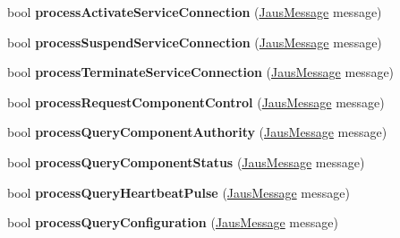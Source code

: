 \begin{DoxyCompactItemize}
\item 
\hypertarget{class_node_manager_component_ab9443469df32a00207f44ea2fa07f531}{bool {\bfseries process\-Activate\-Service\-Connection} (\hyperlink{struct_jaus_message_struct}{\-Jaus\-Message} message)}\label{class_node_manager_component_ab9443469df32a00207f44ea2fa07f531}

\item 
\hypertarget{class_node_manager_component_a3ed305004e96334fae763288e8a551cc}{bool {\bfseries process\-Suspend\-Service\-Connection} (\hyperlink{struct_jaus_message_struct}{\-Jaus\-Message} message)}\label{class_node_manager_component_a3ed305004e96334fae763288e8a551cc}

\item 
\hypertarget{class_node_manager_component_a898b7b6e91779ea6cbbbf28807718c7d}{bool {\bfseries process\-Terminate\-Service\-Connection} (\hyperlink{struct_jaus_message_struct}{\-Jaus\-Message} message)}\label{class_node_manager_component_a898b7b6e91779ea6cbbbf28807718c7d}

\item 
\hypertarget{class_node_manager_component_a0e5a0329938c340ba983cdf57c12250f}{bool {\bfseries process\-Request\-Component\-Control} (\hyperlink{struct_jaus_message_struct}{\-Jaus\-Message} message)}\label{class_node_manager_component_a0e5a0329938c340ba983cdf57c12250f}

\item 
\hypertarget{class_node_manager_component_a177102f3bf05f35df44d4f084e5f17dc}{bool {\bfseries process\-Query\-Component\-Authority} (\hyperlink{struct_jaus_message_struct}{\-Jaus\-Message} message)}\label{class_node_manager_component_a177102f3bf05f35df44d4f084e5f17dc}

\item 
\hypertarget{class_node_manager_component_abda643955bbb5515d785b2b74fcdbbdc}{bool {\bfseries process\-Query\-Component\-Status} (\hyperlink{struct_jaus_message_struct}{\-Jaus\-Message} message)}\label{class_node_manager_component_abda643955bbb5515d785b2b74fcdbbdc}

\item 
\hypertarget{class_node_manager_component_a9ae4993d1f083f60d656c70029b86e24}{bool {\bfseries process\-Query\-Heartbeat\-Pulse} (\hyperlink{struct_jaus_message_struct}{\-Jaus\-Message} message)}\label{class_node_manager_component_a9ae4993d1f083f60d656c70029b86e24}

\item 
\hypertarget{class_node_manager_component_a2e81021c39bdab04c104fe00d34db645}{bool {\bfseries process\-Query\-Configuration} (\hyperlink{struct_jaus_message_struct}{\-Jaus\-Message} message)}\label{class_node_manager_component_a2e81021c39bdab04c104fe00d34db645}


\end{DoxyCompactItemize}
